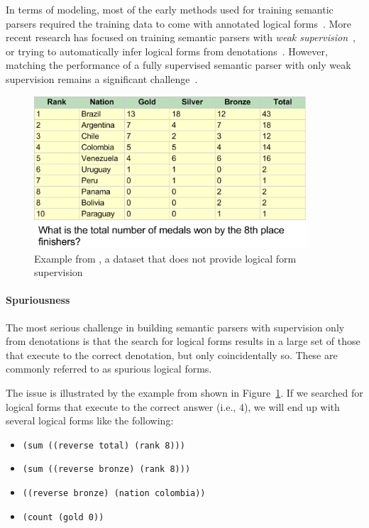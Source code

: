 In terms of modeling, most of the early methods used for training semantic
parsers required the training data to come with annotated logical
forms~\citep{zelle1996learning,Zettlemoyer2005LearningTM}. More recent research has
focused on training semantic parsers with \emph{weak 
supervision}~\citep{liang2011learning,berant2013semantic}, or trying to automatically infer
logical forms from denotations~\citep{pasupat2016inferring}. However, matching
the performance of a fully supervised semantic parser with only weak
supervision remains a significant challenge~\citep{Yih2016TheVO}.


\begin{figure}
	\centering
	\includegraphics[width=4in]{figures/wikitables_example.png}
	\caption{Example from \WTQ{}, a dataset that does not provide
	logical form supervision}\label{fig:wikitables_example_weaksup}
\end{figure}

\paragraph{Spuriousness} The most serious challenge in building semantic parsers
with supervision only from denotations is that the search for logical forms
results in a large set of those that execute to the correct denotation, but only
coincidentally so. These are commonly referred to as spurious logical forms.

The issue is illustrated by the example from \WTQ{} shown in
Figure~\ref{fig:wikitables_example_weaksup}.
If we searched for logical forms that execute to
the correct answer (i.e., $4$), we will end up with several logical forms like
the following:

\begin{itemize}
	\item \texttt{(sum ((reverse total) (rank 8)))}
	\item \texttt{(sum ((reverse bronze) (rank 8)))}
	\item \texttt{((reverse bronze) (nation colombia))}
	\item \texttt{(count (gold 0))}
\end{itemize}

